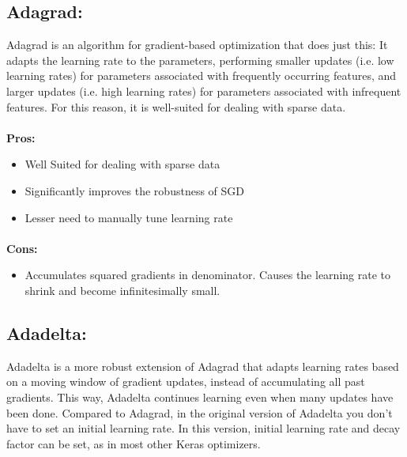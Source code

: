 \documentclass{report}
\begin{document}
\subsection{Adagrad: }
Adagrad \cite{Adagrad} is an algorithm for gradient-based optimization that does just this: It adapts the learning rate to the parameters, performing smaller updates
(i.e. low learning rates) for parameters associated with frequently occurring features, and larger updates (i.e. high learning rates) for parameters associated with infrequent features. For this reason, it is well-suited for dealing with sparse data.
\paragraph{}
\textbf{Pros: }
\begin{itemize}
\item Well Suited for dealing with sparse data
\item Significantly improves the robustness of SGD
\item Lesser need to manually tune learning rate

\end{itemize}

\paragraph{}
\textbf{Cons: }
\begin{itemize}

\end{itemize}

\begin{itemize}
\item Accumulates squared gradients in denominator. Causes the learning rate to shrink and become infinitesimally small.  

\end{itemize}


\subsection{Adadelta: }
Adadelta \cite{Adadelta} is a more robust extension of Adagrad that adapts learning rates based on a moving window of gradient updates, instead of accumulating all past gradients. This way, Adadelta continues learning even when many updates have been done. Compared to Adagrad, in the original version of Adadelta you don't have to set an initial learning rate. In this version, initial learning rate and decay factor can be set, as in most other Keras optimizers.
\end{document}
